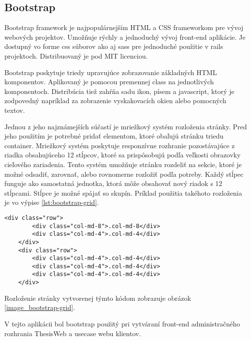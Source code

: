	\subsection{Bootstrap}
	Bootstrap framework je najpopulárnejším HTML a CSS frameworkom pre vývoj webových projektov. Umožňuje rýchly a jednoduchý vývoj front-end aplikácie. Je dostupný vo forme css súborov ako aj sass pre jednoduché použitie v rails projektoch. Distribuovaný je pod MIT licenciou.
	
	Bootstrap poskytuje triedy upravujúce zobrazovanie základných HTML komponentov. Aplikovaný je pomocou premennej class na jednotlivých komponentoch. Distribúcia tiež zahŕňa sadu ikon, písem a javascript, ktorý je zodpovedný napríklad za zobrazenie vyskakovacích okien alebo pomocných textov. 
	
	Jednou z jeho najznámejších súčastí je mriežkový systém rozloženia stránky. Pred jeho použitím je potrebné pridať elementom, ktoré obaľujú stránku triedu container.	Mriežkový systém poskytuje responzívne rozhranie pozostávajúce z riadka obsahujúceho 12 stĺpcov, ktoré sa prispôsobujú podľa veľkosti obrazovky cieľového zariadenia. Tento systém umožňuje stránku rozdeliť na sekcie, ktoré je možné odsadiť, zarovnať, alebo rovnomerne rozložiť podľa potreby. Každý stĺpec funguje ako samostatná jednotka, ktorá môže obsahovať nový riadok s 12 stĺpcami. Stĺpce je možné spájať so skupín. Príklad použitia takéhoto rozloženia je vo výpise \ref{lst:bootstrap-grid}.
	\begin{lstlisting}[label=lst:bootstrap-grid,caption=Príklad použitia Bootstrap grid systému]
	<div class="row">
		<div class="col-md-8">.col-md-8</div>
		<div class="col-md-4">.col-md-4</div>
	</div>
	<div class="row">
		<div class="col-md-4">.col-md-4</div>
		<div class="col-md-4">.col-md-4</div>
		<div class="col-md-4">.col-md-4</div>
	</div>
	\end{lstlisting}
	
	Rozloženie stránky vytvorenej týmto kódom zobrazuje obrázok \ref{image_bootstrap-grid}.
		
			
	V tejto aplikácii bol bootstrap použitý pri vytváraní front-end administračného rozhrania ThesisWeb a usecase webu klientov.
	